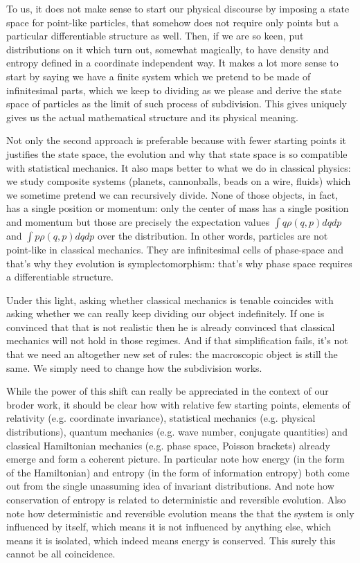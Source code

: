 \documentclass[11pt]{article}
\begin{document}
To us, it does not make sense to start our physical discourse by imposing a state space for point-like particles, that somehow does not require only points but a particular differentiable structure as well. Then, if we are so keen, put distributions on it which turn out, somewhat magically, to have density and entropy defined in a coordinate independent way. It makes a lot more sense to start by saying we have a finite system which we pretend to be made of infinitesimal parts, which we keep to dividing as we please and derive the state space of particles as the limit of such process of subdivision. This gives uniquely gives us the actual mathematical structure and its physical meaning.

Not only the second approach is preferable because with fewer starting points it justifies the state space, the evolution and why that state space is so compatible with statistical mechanics. It also maps better to what we do in classical physics: we study composite systems (planets, cannonballs, beads on a wire, fluids) which we sometime pretend we can recursively divide. None of those objects, in fact, has a single position or momentum: only the center of mass has a single position and momentum but those are precisely the expectation values $\int q \rho(q,p) dq dp$ and $\int p \rho(q,p) dq dp$ over the distribution. In other words, particles are not point-like in classical mechanics. They are infinitesimal cells of phase-space and that's why they evolution is symplectomorphism: that's why phase space requires a differentiable structure.

Under this light, asking whether classical mechanics is tenable coincides with asking whether we can really keep dividing our object indefinitely. If one is convinced that that is not realistic then he is already convinced that classical mechanics will not hold in those regimes. And if that simplification fails, it's not that we need an altogether new set of rules: the macroscopic object is still the same. We simply need to change how the subdivision works.

While the power of this shift can really be appreciated in the context of our broder work, it should be clear how with relative few starting points, elements of relativity (e.g. coordinate invariance), statistical mechanics (e.g. physical distributions), quantum mechanics (e.g. wave number, conjugate quantities) and classical Hamiltonian mechanics (e.g. phase space, Poisson brackets) already emerge and form a coherent picture. In particular note how energy (in the form of the Hamiltonian) and entropy (in the form of information entropy) both come out from the single unassuming idea of invariant distributions. And note how conservation of entropy is related to deterministic and reversible evolution. Also note how deterministic and reversible evolution means the that the system is only influenced by itself, which means it is not influenced by anything else, which means it is isolated, which indeed means energy is conserved. This surely this cannot be all coincidence.
\end{document}
